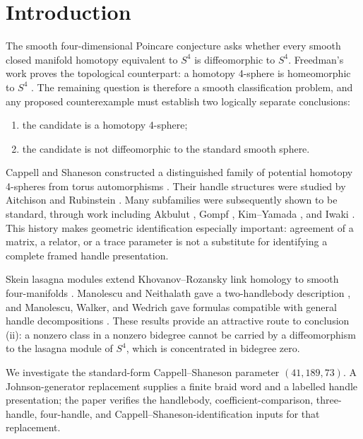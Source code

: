 \section{Introduction}

The smooth four-dimensional Poincare conjecture asks whether every smooth
closed manifold homotopy equivalent to $S^4$ is diffeomorphic to $S^4$.
Freedman's work proves the topological counterpart: a homotopy 4-sphere is
homeomorphic to $S^4$ \cite{Freedman1982}.  The remaining question is
therefore a smooth classification problem, and any proposed counterexample
must establish two logically separate conclusions:
\begin{enumerate}
\item the candidate is a homotopy 4-sphere;
\item the candidate is not diffeomorphic to the standard smooth sphere.
\end{enumerate}

Cappell and Shaneson constructed a distinguished family of potential
homotopy 4-spheres from torus automorphisms \cite{CappellShaneson1976}.
Their handle structures were studied by Aitchison and Rubinstein
\cite{AitchisonRubinstein1984}.  Many subfamilies were subsequently shown to
be standard, through work including Akbulut \cite{Akbulut2010}, Gompf
\cite{Gompf2010}, Kim--Yamada \cite{KimYamada2017}, and Iwaki
\cite{Iwaki2024}.  This history makes geometric identification especially
important: agreement of a matrix, a relator, or a trace parameter is not a
substitute for identifying a complete framed handle presentation.

Skein lasagna modules extend Khovanov--Rozansky link homology to smooth
four-manifolds \cite{MorrisonWalkerWedrich2019}.  Manolescu and Neithalath
gave a two-handlebody description \cite{ManolescuNeithalath2020}, and
Manolescu, Walker, and Wedrich gave formulas compatible with general handle
decompositions \cite{ManolescuWalkerWedrich2023}.  These results provide an
attractive route to conclusion (ii): a nonzero class in a nonzero bidegree
cannot be carried by a diffeomorphism to the lasagna module of $S^4$, which
is concentrated in bidegree zero.

We investigate the standard-form Cappell--Shaneson parameter
$(41,189,73)$.  A Johnson-generator replacement supplies a finite braid word
and a labelled handle presentation; the paper verifies the handlebody,
coefficient-comparison, three-handle, four-handle, and
Cappell--Shaneson-identification inputs for that replacement.

